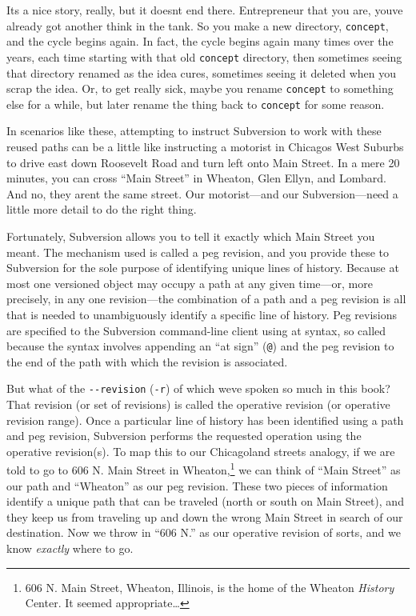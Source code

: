 It\textquotesingle s a nice story, really, but it
doesn\textquotesingle t end there. Entrepreneur that you are,
you\textquotesingle ve already got another think in the tank. So you
make a new directory, \texttt{concept}, and the cycle begins again. In
fact, the cycle begins again many times over the years, each time
starting with that old \texttt{concept} directory, then sometimes seeing
that directory renamed as the idea cures, sometimes seeing it deleted
when you scrap the idea. Or, to get really sick, maybe you rename
\texttt{concept} to something else for a while, but later rename the
thing back to \texttt{concept} for some reason.

In scenarios like these, attempting to instruct Subversion to work with
these reused paths can be a little like instructing a motorist in
Chicago\textquotesingle s West Suburbs to drive east down Roosevelt Road
and turn left onto Main Street. In a mere 20 minutes, you can cross
``Main Street'' in Wheaton, Glen Ellyn, and Lombard. And no, they
aren\textquotesingle t the same street. Our motorist---and our
Subversion---need a little more detail to do the right thing.

Fortunately, Subversion allows you to tell it exactly which Main Street
you meant. The mechanism used is called a peg revision, and you provide
these to Subversion for the sole purpose of identifying unique lines of
history. Because at most one versioned object may occupy a path at any
given time---or, more precisely, in any one revision---the combination
of a path and a peg revision is all that is needed to unambiguously
identify a specific line of history. Peg revisions are specified to the
Subversion command-line client using at syntax, so called because the
syntax involves appending an ``at sign'' (\texttt{@}) and the peg
revision to the end of the path with which the revision is associated.

But what of the \texttt{-\/-revision} (\texttt{-r}) of which
we\textquotesingle ve spoken so much in this book? That revision (or set
of revisions) is called the operative revision (or operative revision
range). Once a particular line of history has been identified using a
path and peg revision, Subversion performs the requested operation using
the operative revision(s). To map this to our Chicagoland streets
analogy, if we are told to go to 606 N. Main Street in
Wheaton,\footnote{606 N. Main Street, Wheaton, Illinois, is the home of
  the Wheaton \emph{History} Center. It seemed appropriate\ldots{}} we
can think of ``Main Street'' as our path and ``Wheaton'' as our peg
revision. These two pieces of information identify a unique path that
can be traveled (north or south on Main Street), and they keep us from
traveling up and down the wrong Main Street in search of our
destination. Now we throw in ``606 N.'' as our operative revision of
sorts, and we know \emph{exactly} where to go.

